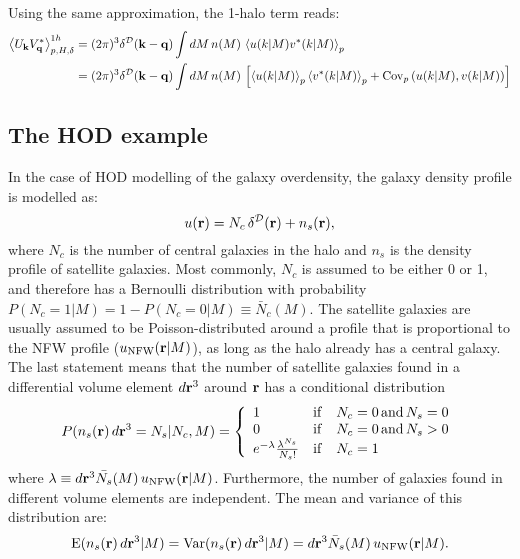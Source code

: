 \documentclass{article}
\begin{document}
Using the same approximation, the 1-halo term reads:
\begin{align}
  \left\langle U_{\bf k}V^*_{\bf q}\right\rangle_{p,H,\delta}^{1h}&=(2\pi)^3\delta^{\cal D}({\bf k}-{\bf q})\int dM\,n(M)\,\left\langle u(k|M) v^*(k|M)\right\rangle_p\\
  &=(2\pi)^3\delta^{\cal D}({\bf k}-{\bf q})\int dM\,n(M)\,\left[\left\langle u(k|M)\right\rangle_p\left\langle v^*(k|M)\right\rangle_p+{\rm Cov}_p\left(u(k|M),v(k|M)\right)\right]
\end{align}

\subsection{The HOD example}
In the case of HOD modelling of the galaxy overdensity, the galaxy density profile is modelled as:
\begin{equation}
  u({\bf r})=N_c\,\delta^{\cal D}({\bf r})+n_s({\bf r}),
\end{equation}
where $N_c$ is the number of central galaxies in the halo and $n_s$ is the density profile of satellite galaxies. Most commonly, $N_c$ is assumed to be either 0 or 1, and therefore has a Bernoulli distribution with probability $P(N_c=1|M)=1-P(N_c=0|M)\equiv \bar{N}_c(M)$. The satellite galaxies are usually assumed to be Poisson-distributed around a profile that is proportional to the NFW profile ($u_{\rm NFW}({\bf r}|M)$), as long as the halo already has a central galaxy. The last statement means that the number of satellite galaxies found in a differential volume element $d{\bf r}^3$ around ${\bf r}$ has a conditional distribution
\begin{equation}
 P(n_s({\bf r})\,d{\bf r}^3=N_s|N_c,M)=
 \left\{\begin{array}{lll}
          1 & {\rm if} & N_c=0\,{\rm and}\,N_s=0\\
          0 & {\rm if} & N_c=0\,{\rm and}\,N_s>0\\
          e^{-\lambda}\frac{\lambda^{N_s}}{N_s!} & {\rm if} & N_c=1
        \end{array}\right.
\end{equation}
where $\lambda\equiv d{\bf r}^3\bar{N_s}(M)\,u_{\rm NFW}({\bf r}|M)$. Furthermore, the number of galaxies found in different volume elements are independent. The mean and variance of this distribution are:
\begin{equation}
 {\rm E}(n_s({\bf r})\,d{\bf r}^3|M)={\rm Var}(n_s({\bf r})\,d{\bf r}^3|M)=d{\bf r}^3 \bar{N}_s(M)\,u_{\rm NFW}({\bf r}|M).
\end{equation}
\end{document}
